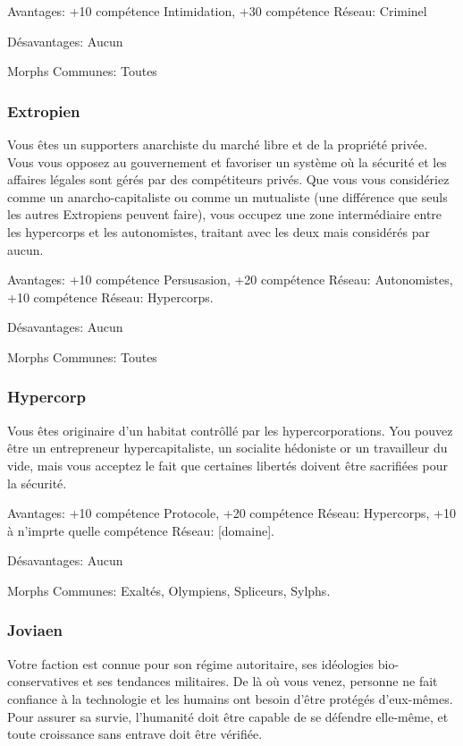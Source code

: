 Avantages: +10 compétence Intimidation, +30 compétence Réseau: Criminel 

Désavantages: Aucun 

Morphs Communes: Toutes 

\subsubsection{Extropien} \label{sec:extropian} 

Vous êtes un supporters anarchiste du marché libre et de la propriété privée. Vous vous opposez au gouvernement et favoriser un système où la sécurité et les affaires légales sont gérés par des compétiteurs privés. Que vous vous considériez comme un anarcho-capitaliste ou comme un mutualiste (une différence que seuls les autres Extropiens peuvent faire), vous occupez une zone intermédiaire entre les hypercorps et les autonomistes, traitant avec les deux mais considérés par aucun. 

Avantages: +10 compétence Persusasion, +20 compétence Réseau: Autonomistes, +10 compétence Réseau: Hypercorps. 

Désavantages: Aucun 

Morphs Communes: Toutes 

\subsubsection{Hypercorp} \label{sec:hypercorp} 

Vous êtes originaire d'un habitat contrôllé par les hypercorporations. You pouvez être un entrepreneur hypercapitaliste, un socialite hédoniste or un travailleur du vide, mais vous acceptez le fait que certaines libertés doivent être sacrifiées pour la sécurité. 

Avantages: +10 compétence Protocole, +20 compétence Réseau: Hypercorps, +10 à n'imprte quelle compétence Réseau: [domaine]. 

Désavantages: Aucun 

Morphs Communes: Exaltés, Olympiens, Spliceurs, Sylphs. 

\subsubsection{Joviaen} \label{sec:jovian} 

Votre faction est connue pour son régime autoritaire, ses idéologies bio-conservatives et ses tendances militaires. De là où vous venez, personne ne fait confiance à la technologie et les humains ont besoin d'être protégés d'eux-mêmes. Pour assurer sa survie, l'humanité doit être capable de se défendre elle-même, et toute croissance sans entrave doit être vérifiée. 

